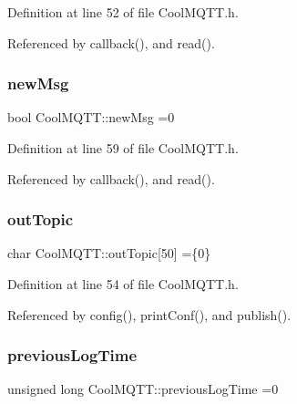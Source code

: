 Definition at line 52 of file Cool\+M\+Q\+T\+T.\+h.



Referenced by callback(), and read().

\mbox{\label{classCoolMQTT_a3240388137b885775aadf38e96b24c6b}} 
\subsubsection{\texorpdfstring{new\+Msg}{newMsg}}
{\footnotesize\ttfamily bool Cool\+M\+Q\+T\+T\+::new\+Msg =0\hspace{0.3cm}{\ttfamily [private]}}



Definition at line 59 of file Cool\+M\+Q\+T\+T.\+h.



Referenced by callback(), and read().

\mbox{\label{classCoolMQTT_a109c786a17b463f9eeba046194279522}} 
\subsubsection{\texorpdfstring{out\+Topic}{outTopic}}
{\footnotesize\ttfamily char Cool\+M\+Q\+T\+T\+::out\+Topic\mbox{[}50\mbox{]} =\{\textquotesingle{}0\textquotesingle{}\}\hspace{0.3cm}{\ttfamily [private]}}



Definition at line 54 of file Cool\+M\+Q\+T\+T.\+h.



Referenced by config(), print\+Conf(), and publish().

\mbox{\label{classCoolMQTT_a3db37ef9ed3b05b2a8d44edba0e7d3cc}} 
\subsubsection{\texorpdfstring{previous\+Log\+Time}{previousLogTime}}
{\footnotesize\ttfamily unsigned long Cool\+M\+Q\+T\+T\+::previous\+Log\+Time =0\hspace{0.3cm}{\ttfamily [private]}}



